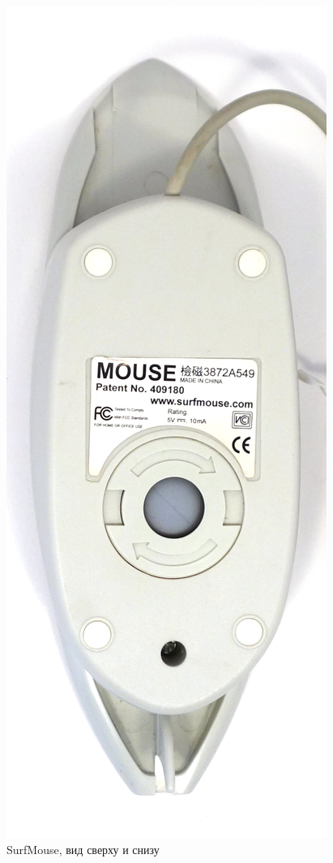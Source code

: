 \documentclass[11pt, a4paper]{article}
\begin{document}
\begin{figure}[h]
    \includegraphics[scale=0.46]{2000_surf_mouse/bottom_60.jpg}
    \caption{SurfMouse, вид сверху и снизу}
    \label{fig:SurfMouseTopBottom}
\end{figure}
\end{document}
